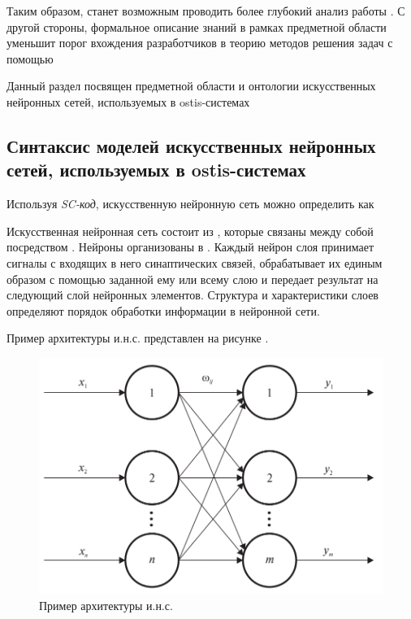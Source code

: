 Таким образом, станет возможным проводить более глубокий анализ работы . С другой стороны, формальное описание знаний в рамках предметной области  уменьшит порог вхождения разработчиков в теорию методов решения задач с помощью 

Данный раздел посвящен предметной области и онтологии искусственных нейронных сетей, используемых в ostis-системах

\subsection{Синтаксис моделей искусственных нейронных сетей, используемых в ostis-системах}

Используя \textit{SC-код}, искусственную нейронную сеть можно определить как 

\begin{SCn}
\end{SCn}

Искусственная нейронная сеть состоит из , которые связаны между собой посредством . Нейроны организованы в . Каждый нейрон слоя принимает сигналы с входящих в него синаптических связей, обрабатывает их единым образом с помощью заданной ему или всему слою  и передает результат на следующий слой нейронных элементов. Структура и характеристики слоев определяют порядок обработки информации в нейронной сети.

Пример архитектуры и.н.с. представлен на рисунке \textit{}.

\begin{figure}[H]
	\includegraphics[scale=0.3]{author/part3/figures/neural_network.png}
	\caption{Пример архитектуры и.н.с.}
	\label{fig:nn_example}
\end{figure}

